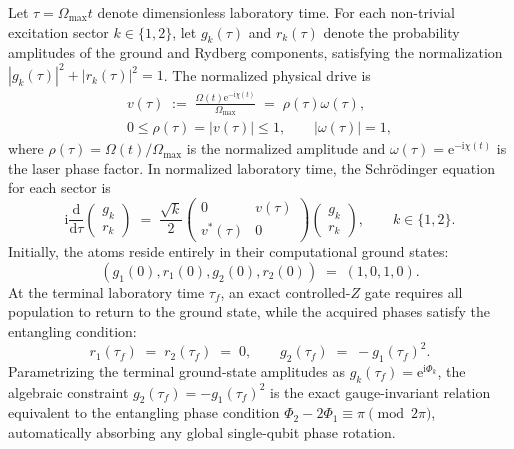 \documentclass[aps,prx,reprint,nofootinbib,longbibliography,floatfix]{revtex4-2}
\theoremstyle{plain}
\theoremstyle{remark}
\newcommand{\Omax}{\Omega_{\max}}
\newcommand{\dd}{\mathrm{d}}
\newcommand{\ee}{\mathrm{e}}
\newcommand{\ii}{\mathrm{i}}
\begin{document}
Let $\tau = \Omax t$ denote dimensionless laboratory time. For each non-trivial excitation sector $k \in \{1, 2\}$, let $g_k(\tau)$ and $r_k(\tau)$ denote the probability amplitudes of the ground and Rydberg components, satisfying the normalization $|g_k(\tau)|^2 + |r_k(\tau)|^2 = 1$. The normalized physical drive is
\begin{equation}
\begin{gathered}
v(\tau) \;:=\; \frac{\Omega(t)\ee^{-\ii\chi(t)}}{\Omax} \;=\; \rho(\tau)\omega(\tau), \\
0 \le \rho(\tau) = |v(\tau)| \le 1, \qquad |\omega(\tau)| = 1,
\end{gathered}
\label{eq:physical_control}
\end{equation}
where $\rho(\tau) = \Omega(t)/\Omax$ is the normalized amplitude and $\omega(\tau) = \ee^{-\ii\chi(t)}$ is the laser phase factor. In normalized laboratory time, the Schrödinger equation for each sector is
\begin{equation}
\ii \frac{\dd}{\dd \tau} \begin{pmatrix} g_k \\ r_k \end{pmatrix}
\;=\;
\frac{\sqrt{k}}{2}
\begin{pmatrix}
0 & v(\tau) \\
v^*(\tau) & 0
\end{pmatrix}
\begin{pmatrix} g_k \\ r_k \end{pmatrix},
\qquad k \in \{1, 2\}.
\label{eq:schrod_lab}
\end{equation}
Initially, the atoms reside entirely in their computational ground states:
\begin{equation}
(g_1(0), r_1(0), g_2(0), r_2(0)) \;=\; (1, 0, 1, 0).
\label{eq:initial_cond}
\end{equation}
At the terminal laboratory time $\tau_f$, an exact controlled-$Z$ gate requires all population to return to the ground state, while the acquired phases satisfy the entangling condition:
\begin{equation}
r_1(\tau_f) \;=\; r_2(\tau_f) \;=\; 0,
\qquad
g_2(\tau_f) \;=\; - g_1(\tau_f)^2.
\label{eq:CZ_cond}
\end{equation}
Parametrizing the terminal ground-state amplitudes as $g_k(\tau_f) = \ee^{\ii \Phi_k}$, the algebraic constraint $g_2(\tau_f) = -g_1(\tau_f)^2$ is the exact gauge-invariant relation equivalent to the entangling phase condition $\Phi_2 - 2\Phi_1 \equiv \pi \pmod{2\pi}$, automatically absorbing any global single-qubit phase rotation.
\end{document}
